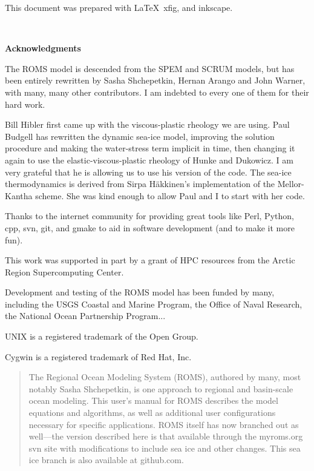 \setcounter{page}{0}
This document was prepared with \LaTeX\, xfig, and inkscape.

\mbox{  }
\begin{center}
\bf \LARGE Acknowledgments
\end{center}

The ROMS model is descended from the SPEM and SCRUM models, but has
been entirely rewritten by Sasha Shchepetkin, Hernan Arango and John
Warner, with many, many other contributors. I am indebted to every one
of them for their hard work.

Bill Hibler first came up with the viscous-plastic rheology we are
using. Paul Budgell has rewritten the dynamic sea-ice model, improving
the solution procedure and making the water-stress term implicit in time,
then changing it again to use the elastic-viscous-plastic rheology of
Hunke and Dukowicz. I am very grateful that he is allowing us to use
his version of the code. The sea-ice thermodynamics is derived from
Sirpa H\"akkinen's implementation of the Mellor-Kantha scheme. She was
kind enough to allow Paul and I to start with her code.

Thanks to the internet community for providing great tools like Perl,
Python, cpp, svn, git, and gmake to aid in software development (and to make
it more fun).

This work was supported in part by a grant of HPC resources from the
Arctic Region Supercomputing Center.

Development and testing of the ROMS model has been funded by many,
including the USGS Coastal and Marine Program, the Office of Naval
Research, the National Ocean Partnership Program...

\vspace{\fill}
UNIX is a registered trademark of the Open Group.

Cygwin is a registered trademark of Red Hat, Inc.


\vfil\break
\begin{abstract}
The Regional Ocean Modeling System (ROMS), authored by many, most
notably Sasha Shchepetkin, is one approach to regional and basin-scale ocean
modeling. This user's manual for ROMS describes the model equations
and algorithms, as well as additional user configurations necessary
for specific applications. ROMS itself has now branched out as
well---the version described here is that available through the
myroms.org svn site with modifications to include sea ice and other
changes. This sea ice branch is also available at github.com.

\end{abstract}
